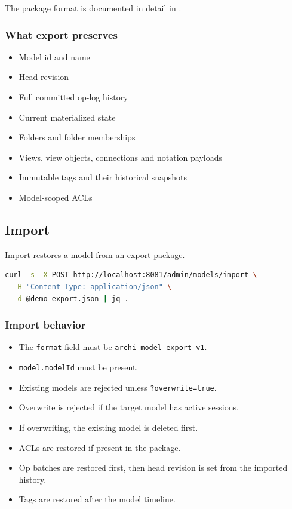 The package format is documented in detail in .

\subsubsection{What export preserves}

\begin{itemize}
\item Model id and name
\item Head revision
\item Full committed op-log history
\item Current materialized state
\item Folders and folder memberships
\item Views, view objects, connections and notation payloads
\item Immutable tags and their historical snapshots
\item Model-scoped ACLs
\end{itemize}

\subsection{Import}

Import restores a model from an export package.

\begin{lstlisting}[language=bash,caption={Import a model}]
curl -s -X POST http://localhost:8081/admin/models/import \
  -H "Content-Type: application/json" \
  -d @demo-export.json | jq .
\end{lstlisting}

\subsubsection{Import behavior}

\begin{itemize}
\item The \texttt{format} field must be \texttt{archi-model-export-v1}.
\item \texttt{model.modelId} must be present.
\item Existing models are rejected unless \texttt{?overwrite=true}.
\item Overwrite is rejected if the target model has active sessions.
\item If overwriting, the existing model is deleted first.
\item ACLs are restored if present in the package.
\item Op batches are restored first, then head revision is set from the
  imported history.
\item Tags are restored after the model timeline.
\end{itemize}

